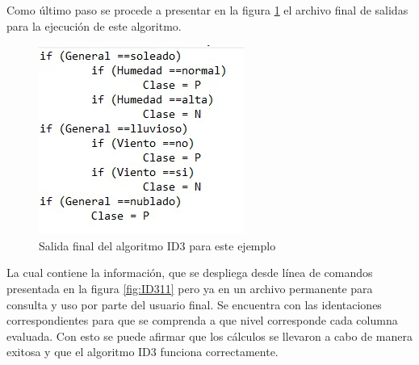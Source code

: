  Como último paso se procede a presentar en la figura \ref{fig:ID322} el archivo final de salidas para la ejecución de este algoritmo. 
  \begin{figure}[H]
  	\begin{center}
  		\hypertarget{fig:ID322}{\hspace{1pt}}
  		\includegraphics[width=.5\textwidth]{capitulo4a/images/ID3_FINAL.png}
  		\caption{Salida final del algoritmo ID3 para este ejemplo}
  		\label{fig:ID322}
  	\end{center}
  \end{figure}
 La cual contiene la información, que se despliega desde línea de comandos presentada en la figura \ref{fig:ID311} pero ya en un archivo permanente para consulta y uso por parte del usuario final. 
 Se encuentra con las identaciones correspondientes para que se comprenda a que nivel corresponde cada columna evaluada.
 Con esto se puede afirmar que los cálculos se llevaron a cabo de manera exitosa y que el algoritmo ID3 funciona correctamente.